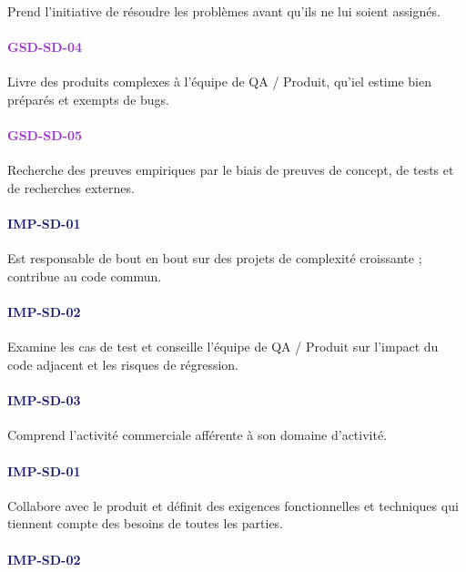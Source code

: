 \documentclass[a4paper, french, openany, 12pt]{book}
\newcommand\str[1]{\textcolor{DarkOrchid}{\textbf{\uppercase{gsd-{#1}}}}}
\newcommand\wis[1]{\textcolor{MidnightBlue}{\textbf{\uppercase{imp-{#1}}}}}
\begin{document}
\begin{multicols}{2}
  Prend l'initiative de résoudre les problèmes avant qu'ils ne lui soient assignés. 

  \paragraph*{\str{sd-04}}

  Livre des produits complexes à l'équipe de QA / Produit, qu'iel estime bien préparés et exempts de bugs.

  \paragraph*{\str{sd-05}}

  Recherche des preuves empiriques par le biais de preuves de concept, de tests et de recherches externes.

  \paragraph*{\wis{sd-01}}

  Est responsable de bout en bout sur des projets de complexité croissante ; contribue au code commun.

  \paragraph*{\wis{sd-02}}

  Examine les cas de test et conseille l'équipe de QA / Produit sur l'impact du code adjacent et les risques de 
  régression.

  \paragraph*{\wis{sd-03}}

  Comprend l'activité commerciale afférente à son domaine d'activité.

  \paragraph*{\wis{sd-01}}

  Collabore avec le produit et définit des exigences fonctionnelles et techniques 
  qui tiennent compte des besoins de toutes les parties.

  \paragraph*{\wis{sd-02}}


\end{multicols}
\end{document}
